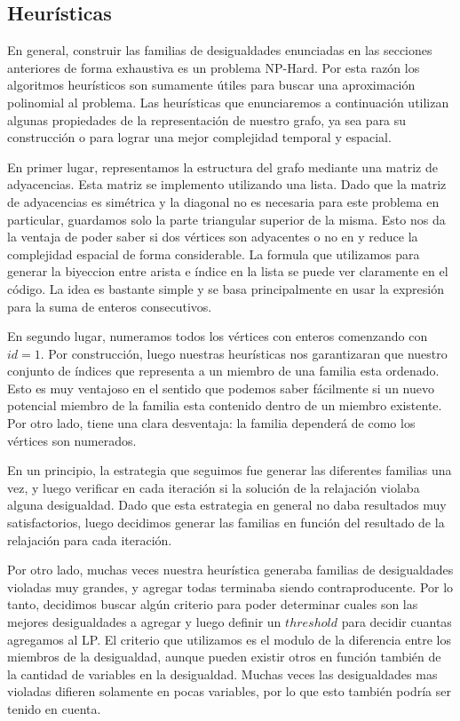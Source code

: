 \subsection{Heurísticas}

En general, construir las familias de desigualdades enunciadas en las secciones anteriores de forma exhaustiva es un problema NP-Hard. Por esta razón los algoritmos heurísticos son sumamente útiles para buscar una aproximación polinomial al problema. Las heurísticas que enunciaremos a continuación utilizan algunas propiedades de la representación de nuestro grafo, ya sea para su construcción o para lograr una mejor complejidad temporal y espacial.

En primer lugar, representamos la estructura del grafo mediante una matriz de adyacencias. Esta matriz se implemento utilizando una lista. Dado que la matriz de adyacencias es simétrica y la diagonal no es necesaria para este problema en particular, guardamos solo la parte triangular superior de la misma. Esto nos da la ventaja de poder saber si dos vértices son adyacentes o no en  y reduce la complejidad espacial de forma considerable. La formula que utilizamos para generar la biyeccion entre arista e índice en la lista se puede ver claramente en el código. La idea es bastante simple y se basa principalmente en usar la expresión para la suma de enteros consecutivos.

En segundo lugar, numeramos todos los vértices con enteros comenzando con $id = 1$. Por construcción, luego nuestras heurísticas nos garantizaran que nuestro conjunto de índices que representa a un miembro de una familia esta ordenado. Esto es muy ventajoso en el sentido que podemos saber fácilmente si un nuevo potencial miembro de la familia esta contenido dentro de un miembro existente. Por otro lado, tiene una clara desventaja: la familia dependerá de como los vértices son numerados.

En un principio, la estrategia que seguimos fue generar las diferentes familias una vez, y luego verificar en cada iteración si la solución de la relajación violaba alguna desigualdad. Dado que esta estrategia en general no daba resultados muy satisfactorios, luego decidimos generar las familias en función del resultado de la relajación para cada iteración.

Por otro lado, muchas veces nuestra heurística generaba familias de desigualdades violadas muy grandes, y agregar todas terminaba siendo contraproducente. Por lo tanto, decidimos buscar algún criterio para poder determinar cuales son las mejores desigualdades a agregar y luego definir un $threshold$ para decidir cuantas agregamos al LP. El criterio que utilizamos es el modulo de la diferencia entre los miembros de la desigualdad, aunque pueden existir otros en función también de la cantidad de variables en la desigualdad. Muchas veces las desigualdades mas violadas difieren solamente en pocas variables, por lo que esto también podría ser tenido en cuenta.

